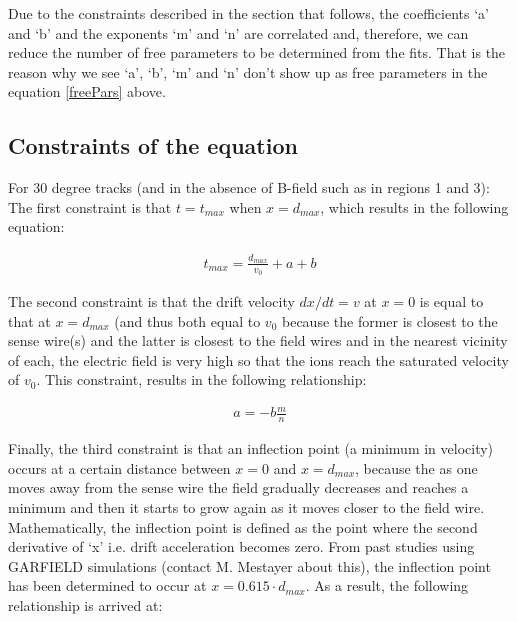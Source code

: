 \documentclass[12pt,epsfig]{article}
\begin{document}
Due to the constraints described in the section that follows, the coefficients `a' and `b' and the exponents `m' and `n' are correlated and, therefore, we can reduce the number of free parameters to be determined from the fits. That is the reason why we see `a', `b', `m' and `n' don't show up as free parameters in the equation \ref{freePars} above.


\subsection{Constraints of the equation}
\label{constraintsTvsX}
For 30 degree tracks (and in the absence of B-field such as in regions 1 and 3): \\
The first constraint is that $t = t_{max}$ when $x = d_{max}$, which results in the following equation:

\begin{equation}
\label{tvsxConstraints1}
\begin{aligned}     
     t_{max} = \frac{d_{max}}{v_0} + a + b
  \end{aligned}
\end{equation}

The second constraint is that the drift velocity $dx/dt = v$ at $x=0$ is equal to that at $x=d_{max}$ (and thus both equal to $v_0$ because the former is closest to the sense wire(s) and the latter is closest to the field wires and in the nearest vicinity of each, the electric field is very high so that the ions reach the saturated velocity of $v_0$. This constraint, results in the following relationship:

\begin{equation}
\label{tvsxConstraints2}
\begin{aligned}     
     a = - b \frac{m}{n}
  \end{aligned}
\end{equation}

Finally, the third constraint is that an inflection point (a minimum in velocity) occurs at a certain distance between $x=0$ and $x=d_{max}$, because the as one moves away from the sense wire the field gradually decreases and reaches a minimum and then it starts to grow again as it moves closer to the field wire. Mathematically, the inflection point is defined as the point where the second derivative of `x' i.e. drift acceleration becomes zero. From past studies using GARFIELD simulations (contact M. Mestayer about this), the inflection point has been determined to occur at $x = 0.615\cdot d_{max}$. As a result, the following relationship is arrived at:
\end{document}
